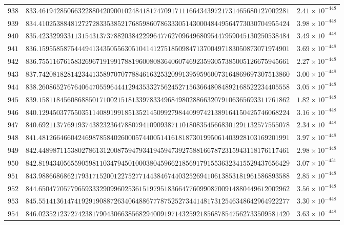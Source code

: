 \documentclass[12pt,reqno]{amsart}
\theoremstyle{remark}
\begin{document}
\begin{longtable}{clc}
$938$ & $833.4619428506632288042090010248418174709171116643439721731465680127002281$ & $2.41\times 10^{-448}$ \\
$939$ & $834.4102538848127272833538521768598607863330514300048449564773030704955424$ & $3.98\times 10^{-448}$ \\
$940$ & $835.4233299331131543137378820384229964776270964968095447959045130250538484$ & $3.49\times 10^{-448}$ \\
$941$ & $836.1595585875444941343505563051041412751850984713700497183050873071974901$ & $3.69\times 10^{-448}$ \\
$942$ & $836.7551167615832696719199178819600808364060746923593057385005126675945661$ & $2.27\times 10^{-448}$ \\
$943$ & $837.7420818281423441358970707788461632532099139595960073164869697307513860$ & $3.00\times 10^{-448}$ \\
$944$ & $838.2608652767640647055964441294353327562452715636648084892168522234405558$ & $3.05\times 10^{-448}$ \\
$945$ & $839.1581184560868850171002151813397833496849802886632079106365693311761862$ & $1.82\times 10^{-448}$ \\
$946$ & $840.1294503775503511408919918513521450992798440997421389164150425746068224$ & $3.16\times 10^{-448}$ \\
$947$ & $840.6921137769193743823236478807941090938711018083545668301291132577555078$ & $2.34\times 10^{-448}$ \\
$948$ & $841.4812664660424698785840260005744005141618187301995061403928103169201991$ & $3.97\times 10^{-448}$ \\
$949$ & $842.4489871153802786131200875947934194594739275881667872315943118176117461$ & $2.98\times 10^{-448}$ \\
$950$ & $842.8194340565590598110347945010003804596621856917915536323415529437656429$ & $3.07\times 10^{-451}$ \\
$951$ & $843.9886686862179317152001227527714438467440325269410613853181961586893588$ & $2.85\times 10^{-448}$ \\
$952$ & $844.6504770577965933329099602536151979518366477609908700914880449612002962$ & $3.56\times 10^{-448}$ \\
$953$ & $845.5514136147419291908872634064886777875252734414817312546348642964922277$ & $3.30\times 10^{-448}$ \\
$954$ & $846.0235212372742381790430663856829400919714325921856878547562733509581420$ & $3.63\times 10^{-448}$ \\

\end{longtable}
\end{document}
